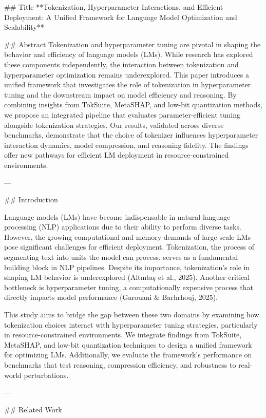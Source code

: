 ## Title  
**Tokenization, Hyperparameter Interactions, and Efficient Deployment: A Unified Framework for Language Model Optimization and Scalability**

## Abstract  
Tokenization and hyperparameter tuning are pivotal in shaping the behavior and efficiency of language models (LMs). While research has explored these components independently, the interaction between tokenization and hyperparameter optimization remains underexplored. This paper introduces a unified framework that investigates the role of tokenization in hyperparameter tuning and the downstream impact on model efficiency and reasoning. By combining insights from TokSuite, MetaSHAP, and low-bit quantization methods, we propose an integrated pipeline that evaluates parameter-efficient tuning alongside tokenization strategies. Our results, validated across diverse benchmarks, demonstrate that the choice of tokenizer influences hyperparameter interaction dynamics, model compression, and reasoning fidelity. The findings offer new pathways for efficient LM deployment in resource-constrained environments.  

---

## Introduction  

Language models (LMs) have become indispensable in natural language processing (NLP) applications due to their ability to perform diverse tasks. However, the growing computational and memory demands of large-scale LMs pose significant challenges for efficient deployment. Tokenization, the process of segmenting text into units the model can process, serves as a fundamental building block in NLP pipelines. Despite its importance, tokenization's role in shaping LM behavior is underexplored (Altıntaş et al., 2025). Another critical bottleneck is hyperparameter tuning, a computationally expensive process that directly impacts model performance (Garouani & Barhrhouj, 2025).  

This study aims to bridge the gap between these two domains by examining how tokenization choices interact with hyperparameter tuning strategies, particularly in resource-constrained environments. We integrate findings from TokSuite, MetaSHAP, and low-bit quantization techniques to design a unified framework for optimizing LMs. Additionally, we evaluate the framework's performance on benchmarks that test reasoning, compression efficiency, and robustness to real-world perturbations.  

---

## Related Work  

